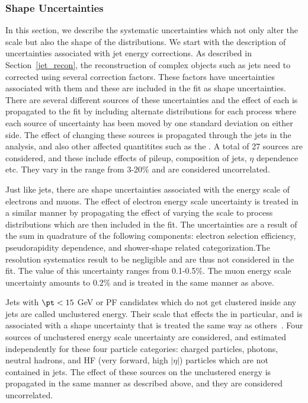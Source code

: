 \subsubsection{Shape Uncertainties}
In this section, we describe the systematic uncertainties which not only alter the scale but also the shape of the distributions. We start with the description of uncertainties associated with jet energy corrections. As described in Section~\ref{jet_recon}, the reconstruction of complex objects such as jets need to corrected using several correction factors. These factors have uncertainties associated with them and these are included in the fit as shape uncertainties. There are several different sources of these uncertainties and the effect of each is propagated to the fit by including alternate distributions for each process where each source of uncertainty has been moved by one standard deviation on either side. The effect of changing these sources is propagated through the jets in the analysis, and also other affected quantitites such as the \ptmiss. A total of 27 sources are considered, and these include effects of pileup, composition of jets, $\eta$ dependence etc. They vary in the range from 3-20\% and are considered uncorrelated.

Just like jets, there are shape uncertainties associated with the energy scale of electrons and muons. The effect of electron energy scale uncertainty is treated in a similar manner by propagating the effect of varying the scale to process distributions which are then included in the fit. The uncertainties are a result of the sum in quadrature of the following components: electron selection efficiency, pseudorapidity dependence, and shower-shape related categorization.The resolution systematics result to be negligible and are thus not considered in the fit. The value of this uncertainty ranges from 0.1-0.5\%. The muon energy scale uncertainty amounts to 0.2\% and is treated in the same manner as above.

Jets with $\pt<15$ GeV or PF candidates which do not get clustered inside any jets are called unclustered energy. Their scale that effects the \ptmiss in particular, and is associated with a shape uncertainty that is treated the same way as others~\cite{Sirunyan:2019kia}. Four sources of unclustered energy scale uncertainty are considered, and estimated independently for these four particle categories: charged particles, photons, neutral hadrons, and HF (very forward, high $|\eta|$) particles which are not contained in jets. The effect of these sources on the unclustered energy is propagated in the same manner as described above, and they are considered uncorrelated.

